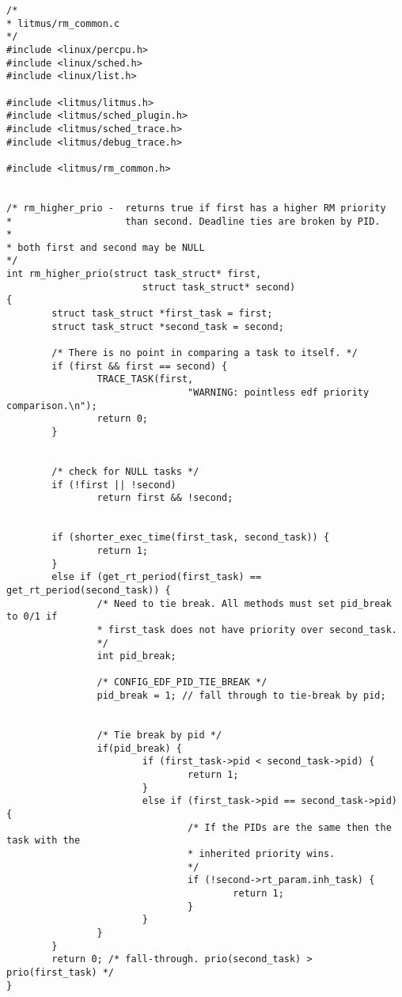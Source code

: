 \begin{lstlisting}[style=cstyle, caption=litmus/rm\_common.c, label=annexe:rm_common]
/*
* litmus/rm_common.c
*/
#include <linux/percpu.h>
#include <linux/sched.h>
#include <linux/list.h>

#include <litmus/litmus.h>
#include <litmus/sched_plugin.h>
#include <litmus/sched_trace.h>
#include <litmus/debug_trace.h>

#include <litmus/rm_common.h>


/* rm_higher_prio -  returns true if first has a higher RM priority
*                    than second. Deadline ties are broken by PID.
*
* both first and second may be NULL
*/
int rm_higher_prio(struct task_struct* first,
                        struct task_struct* second)
{
        struct task_struct *first_task = first;
        struct task_struct *second_task = second;

        /* There is no point in comparing a task to itself. */
        if (first && first == second) {
                TRACE_TASK(first,
                                "WARNING: pointless edf priority comparison.\n");
                return 0;
        }


        /* check for NULL tasks */
        if (!first || !second)
                return first && !second;


        if (shorter_exec_time(first_task, second_task)) {
                return 1;
        }
        else if (get_rt_period(first_task) == get_rt_period(second_task)) {
                /* Need to tie break. All methods must set pid_break to 0/1 if
                * first_task does not have priority over second_task.
                */
                int pid_break;

                /* CONFIG_EDF_PID_TIE_BREAK */
                pid_break = 1; // fall through to tie-break by pid;


                /* Tie break by pid */
                if(pid_break) {
                        if (first_task->pid < second_task->pid) {
                                return 1;
                        }
                        else if (first_task->pid == second_task->pid) {
                                /* If the PIDs are the same then the task with the
                                * inherited priority wins.
                                */
                                if (!second->rt_param.inh_task) {
                                        return 1;
                                }
                        }
                }
        }
        return 0; /* fall-through. prio(second_task) > prio(first_task) */
}


\end{lstlisting}
